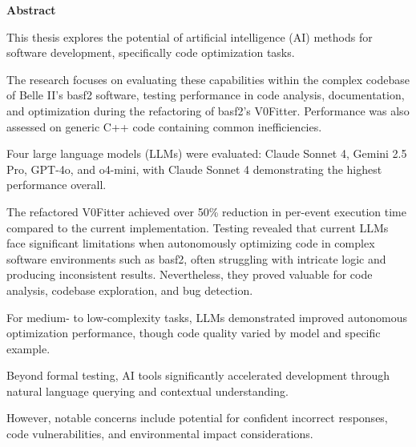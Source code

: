 \thispagestyle{plain}

\begin{spacing}{1.2}
  \large

  \begin{center}
    \vspace*{2cm}
    \textbf{\Large Abstract}
    \vspace{1.5cm}
  \end{center}

  
    This thesis explores the potential of artificial intelligence (AI) methods for software development, specifically code optimization tasks.
    
    The research focuses on evaluating these capabilities within the complex codebase of Belle II's basf2 software, testing performance in code analysis, documentation, and optimization during the refactoring of basf2's V0Fitter.
    Performance was also assessed on generic C++ code containing common inefficiencies.

    Four large language models (LLMs) were evaluated: Claude Sonnet 4, Gemini 2.5 Pro, GPT-4o, and o4-mini, with Claude Sonnet 4 demonstrating the highest performance overall.

    The refactored V0Fitter achieved over 50\% reduction in per-event execution time compared to the current implementation.
    Testing revealed that current LLMs face significant limitations when autonomously optimizing code in complex software environments such as basf2, often struggling with intricate logic and producing inconsistent results.
    Nevertheless, they proved valuable for code analysis, codebase exploration, and bug detection.

    For medium- to low-complexity tasks, LLMs demonstrated improved autonomous optimization performance, though code quality varied by model and specific example.

    Beyond formal testing, AI tools significantly accelerated development through natural language querying and contextual understanding.

    However, notable concerns include potential for confident incorrect responses, code vulnerabilities, and environmental impact considerations.

\end{spacing}
\restoregeometry